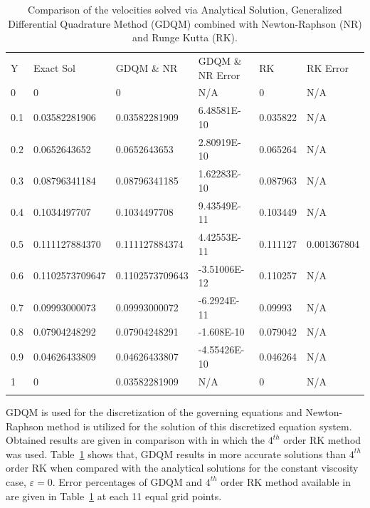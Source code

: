 \begin{table}
\caption{Comparison of the velocities solved via Analytical Solution, Generalized Differential Quadrature Method (GDQM) combined with Newton-Raphson (NR) and Runge Kutta (RK).}
\label{tab:1}       %
\begin{tabular}{llllll}
\hline\noalign{\smallskip}
Y & Exact Sol  & GDQM \& NR & GDQM \& NR Error & RK & RK Error\\
\noalign{\smallskip}\hline\noalign{\smallskip}
0 & 0 & 0 & N/A & 0 & N/A  \\
0.1 & 0.03582281906 & 0.03582281909 & 6.48581E-10 & 0.035822 & N/A \\
0.2 & 0.0652643652 & 0.0652643653 & 2.80919E-10 & 0.065264 & N/A \\
0.3 & 0.08796341184 & 0.08796341185 & 1.62283E-10 & 0.087963 & N/A \\
0.4 & 0.1034497707 & 0.1034497708 & 9.43549E-11 & 0.103449 & N/A \\
0.5 & 0.111127884370 & 0.111127884374 & 4.42553E-11 & 0.111127 &0.001367804\\
0.6 & 0.1102573709647 & 0.1102573709643 & -3.51006E-12 & 0.110257 & N/A \\
0.7 &0.09993000073  & 0.09993000072 & -6.2924E-11 & 0.09993 & N/A\\
0.8 & 0.07904248292 & 0.07904248291 & -1.608E-10 & 0.079042 & N/A \\
0.9 & 0.04626433809 & 0.04626433807& -4.55426E-10 & 0.046264 & N/A \\
1 &  0 & 0.03582281909 & N/A & 0 & N/A \\
\noalign{\smallskip}\hline
\end{tabular}
\end{table}

GDQM is used for the discretization of the governing equations and Newton-Raphson method is utilized for the solution of this discretized equation system. Obtained results are given in comparison with \cite{EegunjobiEntropy} in which the ${{4}^{th}}$ order RK method was used. Table~\ref{tab:1} shows that, GDQM results in more accurate solutions than ${{4}^{th}}$ order RK when compared with the analytical solutions for the constant viscosity case, $\varepsilon =0$. Error percentages of GDQM and ${{4}^{th}}$ order RK method available in \cite{EegunjobiEntropy} are given in Table~\ref{tab:1} at each 11 equal grid points. 

